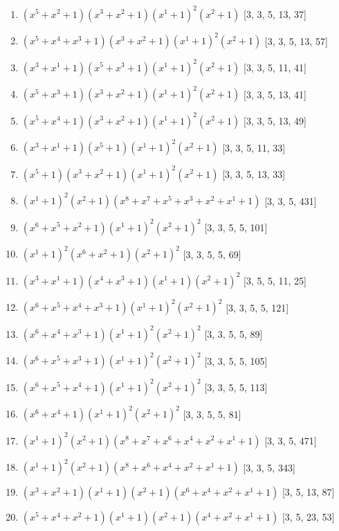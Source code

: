 \documentclass[10pt,twocolumn]{article}
\begin{document}
\begin{enumerate}
\item $(x^{5} + x^{2} + 1)(x^{3} + x^{2} + 1)(x^{1} + 1)^{2}(x^{2} + 1)$  [3, 3, 5, 13, 37]
\item $(x^{5} + x^{4} + x^{3} + 1)(x^{3} + x^{2} + 1)(x^{1} + 1)^{2}(x^{2} + 1)$  [3, 3, 5, 13, 57]
\item $(x^{3} + x^{1} + 1)(x^{5} + x^{3} + 1)(x^{1} + 1)^{2}(x^{2} + 1)$  [3, 3, 5, 11, 41]
\item $(x^{5} + x^{3} + 1)(x^{3} + x^{2} + 1)(x^{1} + 1)^{2}(x^{2} + 1)$  [3, 3, 5, 13, 41]
\item $(x^{5} + x^{4} + 1)(x^{3} + x^{2} + 1)(x^{1} + 1)^{2}(x^{2} + 1)$  [3, 3, 5, 13, 49]
\item $(x^{3} + x^{1} + 1)(x^{5} + 1)(x^{1} + 1)^{2}(x^{2} + 1)$  [3, 3, 5, 11, 33]
\item $(x^{5} + 1)(x^{3} + x^{2} + 1)(x^{1} + 1)^{2}(x^{2} + 1)$  [3, 3, 5, 13, 33]
\item $(x^{1} + 1)^{2}(x^{2} + 1)(x^{8} + x^{7} + x^{5} + x^{3} + x^{2} + x^{1} + 1)$  [3, 3, 5, 431]
\item $(x^{6} + x^{5} + x^{2} + 1)(x^{1} + 1)^{2}(x^{2} + 1)^{2}$  [3, 3, 5, 5, 101]
\item $(x^{1} + 1)^{2}(x^{6} + x^{2} + 1)(x^{2} + 1)^{2}$  [3, 3, 5, 5, 69]
\item $(x^{3} + x^{1} + 1)(x^{4} + x^{3} + 1)(x^{1} + 1)(x^{2} + 1)^{2}$  [3, 5, 5, 11, 25]
\item $(x^{6} + x^{5} + x^{4} + x^{3} + 1)(x^{1} + 1)^{2}(x^{2} + 1)^{2}$  [3, 3, 5, 5, 121]
\item $(x^{6} + x^{4} + x^{3} + 1)(x^{1} + 1)^{2}(x^{2} + 1)^{2}$  [3, 3, 5, 5, 89]
\item $(x^{6} + x^{5} + x^{3} + 1)(x^{1} + 1)^{2}(x^{2} + 1)^{2}$  [3, 3, 5, 5, 105]
\item $(x^{6} + x^{5} + x^{4} + 1)(x^{1} + 1)^{2}(x^{2} + 1)^{2}$  [3, 3, 5, 5, 113]
\item $(x^{6} + x^{4} + 1)(x^{1} + 1)^{2}(x^{2} + 1)^{2}$  [3, 3, 5, 5, 81]
\item $(x^{1} + 1)^{2}(x^{2} + 1)(x^{8} + x^{7} + x^{6} + x^{4} + x^{2} + x^{1} + 1)$  [3, 3, 5, 471]
\item $(x^{1} + 1)^{2}(x^{2} + 1)(x^{8} + x^{6} + x^{4} + x^{2} + x^{1} + 1)$  [3, 3, 5, 343]
\item $(x^{3} + x^{2} + 1)(x^{1} + 1)(x^{2} + 1)(x^{6} + x^{4} + x^{2} + x^{1} + 1)$  [3, 5, 13, 87]
\item $(x^{5} + x^{4} + x^{2} + 1)(x^{1} + 1)(x^{2} + 1)(x^{4} + x^{2} + x^{1} + 1)$  [3, 5, 23, 53]

\end{enumerate}
\end{document}
